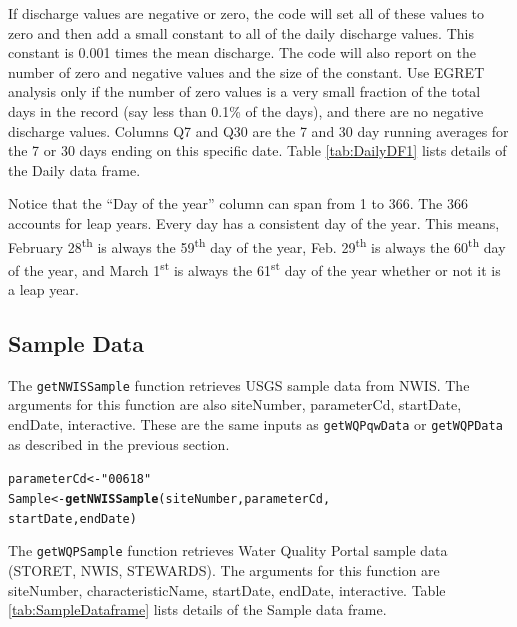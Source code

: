 \documentclass[a4paper,11pt]{article}\usepackage[]{graphicx}\usepackage[]{color}
\makeatletter
\newcommand{\hlstr}[1]{\textcolor[rgb]{0.192,0.494,0.8}{#1}}%
\newcommand{\hlstd}[1]{\textcolor[rgb]{0.345,0.345,0.345}{#1}}%
\newcommand{\hlkwb}[1]{\textcolor[rgb]{0.69,0.353,0.396}{#1}}%
\newcommand{\hlkwd}[1]{\textcolor[rgb]{0.737,0.353,0.396}{\textbf{#1}}}%
\newenvironment{kframe}{%
 \def\at@end@of@kframe{}%
 \ifinner\ifhmode%
  \def\at@end@of@kframe{\end{minipage}}%
  \begin{minipage}{\columnwidth}%
 \fi\fi%
 \def\FrameCommand##1{\hskip\@totalleftmargin \hskip-\fboxsep
 \colorbox{shadecolor}{##1}\hskip-\fboxsep
     \hskip-\linewidth \hskip-\@totalleftmargin \hskip\columnwidth}%
 \MakeFramed {\advance\hsize-\width
   \@totalleftmargin\z@ \linewidth\hsize
   \@setminipage}}%
 {\par\unskip\endMakeFramed%
 \at@end@of@kframe}
\newenvironment{knitrout}{}{} %
\makeatother
\begin{document}
If discharge values are negative or zero, the code will set all of these values to zero and then add a small constant to all of the daily discharge values.  This constant is 0.001 times the mean discharge.  The code will also report on the number of zero and negative values and the size of the constant.  Use EGRET analysis only if the number of zero values is a very small fraction of the total days in the record (say less than 0.1\% of the days), and there are no negative discharge values.  Columns Q7 and Q30 are the 7 and 30 day running averages for the 7 or 30 days ending on this specific date. Table \ref{tab:DailyDF1} lists details of the Daily data frame.

Notice that the \enquote{Day of the year} column can span from 1 to 366. The 366 accounts for leap years. Every day has a consistent day of the year. This means, February 28\textsuperscript{th} is always the 59\textsuperscript{th} day of the year, Feb. 29\textsuperscript{th} is always the 60\textsuperscript{th} day of the year, and March 1\textsuperscript{st} is always the 61\textsuperscript{st} day of the year whether or not it is a leap year.

\FloatBarrier

\subsection{Sample Data}
\label{Samplesubsection}
The \texttt{getNWISSample} function retrieves USGS sample data from NWIS. The arguments for this function are also siteNumber, parameterCd, startDate, endDate, interactive. These are the same inputs as \texttt{getWQPqwData} or \texttt{getWQPData} as described in the previous section.

\begin{knitrout}
\color{fgcolor}\begin{kframe}
\begin{alltt}
\hlstd{parameterCd} \hlkwb{<-} \hlstr{"00618"}
\hlstd{Sample} \hlkwb{<-}\hlkwd{getNWISSample}\hlstd{(siteNumber,parameterCd,}
      \hlstd{startDate, endDate)}
\end{alltt}
\end{kframe}
\end{knitrout}

The \texttt{getWQPSample} function retrieves Water Quality Portal sample data (STORET, NWIS, STEWARDS). The arguments for this function are siteNumber, characteristicName, startDate, endDate, interactive. Table \ref{tab:SampleDataframe} lists details of the Sample data frame. 
\end{document}

